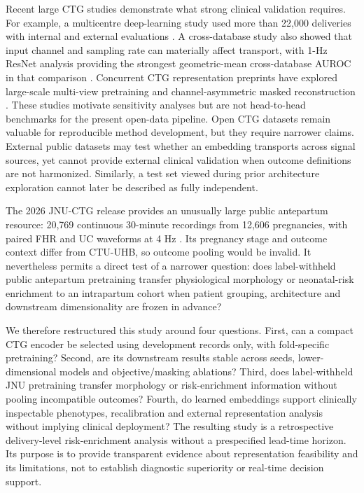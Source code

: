 \documentclass[utf8]{FrontiersinHarvard}
\begin{document}
Recent large CTG studies demonstrate what strong clinical validation requires. For example, a multicentre deep-learning study used more than 22,000 deliveries with internal and external evaluations \citep{park2025nationwide}. A cross-database study also showed that input channel and sampling rate can materially affect transport, with 1-Hz ResNet analysis providing the strongest geometric-mean cross-database AUROC in that comparison \citep{mendis2025crossdatabase}. Concurrent CTG representation preprints have explored large-scale multi-view pretraining and channel-asymmetric masked reconstruction \citep{prismctg2026,fridman2026ctgfoundation}. These studies motivate sensitivity analyses but are not head-to-head benchmarks for the present open-data pipeline. Open CTG datasets remain valuable for reproducible method development, but they require narrower claims. External public datasets may test whether an embedding transports across signal sources, yet cannot provide external clinical validation when outcome definitions are not harmonized. Similarly, a test set viewed during prior architecture exploration cannot later be described as fully independent.

The 2026 JNU-CTG release provides an unusually large public antepartum resource: 20,769 continuous 30-minute recordings from 12,606 pregnancies, with paired FHR and UC waveforms at 4 Hz \citep{bai2026jnuctg}. Its pregnancy stage and outcome context differ from CTU-UHB, so outcome pooling would be invalid. It nevertheless permits a direct test of a narrower question: does label-withheld public antepartum pretraining transfer physiological morphology or neonatal-risk enrichment to an intrapartum cohort when patient grouping, architecture and downstream dimensionality are frozen in advance?

We therefore restructured this study around four questions. First, can a compact CTG encoder be selected using development records only, with fold-specific pretraining? Second, are its downstream results stable across seeds, lower-dimensional models and objective/masking ablations? Third, does label-withheld JNU pretraining transfer morphology or risk-enrichment information without pooling incompatible outcomes? Fourth, do learned embeddings support clinically inspectable phenotypes, recalibration and external representation analysis without implying clinical deployment? The resulting study is a retrospective delivery-level risk-enrichment analysis without a prespecified lead-time horizon. Its purpose is to provide transparent evidence about representation feasibility and its limitations, not to establish diagnostic superiority or real-time decision support.
\end{document}
